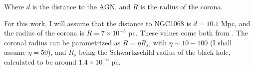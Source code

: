Where $d$ is the distance to the AGN, and $R$ is the radius of the corona.

For this work, I will assume that the distance to NGC1068 is $d = 10.1$ Mpc, and the radius of the corona is $R = 7 \times 10^{-5}$ pc. These values come both from \citet{padovani2024highenergyneutrinosvicinitysupermassive}. The coronal radius can be parametrized as $R = \eta R_s$, with $\eta \sim 10 - 100$ (I shall assume $\eta = 50$), and $R_s$ being the Schwartzschild radius of the black hole, calculated to be around $1.4 \times 10^{-6}$ pc.








